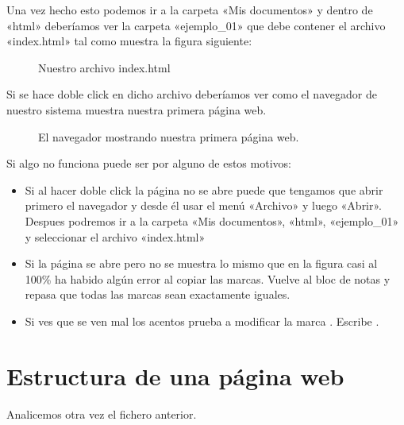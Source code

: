 \documentclass[a4paper,12pt,spanish]{sphinxmanual}
\begin{document}
Una vez hecho esto podemos ir a la carpeta «Mis documentos» y dentro de «html» deberíamos ver la carpeta «ejemplo\_01» que debe contener el archivo «index.html» tal como muestra la figura siguiente:

\begin{figure}[htbp]
\centering
\capstart

\noindent{}
\caption{Nuestro archivo index.html}\label{\detokenize{index:id7}}\end{figure}

Si se hace doble click en dicho archivo deberíamos ver como el navegador de nuestro sistema muestra nuestra primera página web.

\begin{figure}[htbp]
\centering
\capstart

\noindent{}
\caption{El navegador mostrando nuestra primera página web.}\label{\detokenize{index:id8}}\end{figure}

Si algo no funciona puede ser por alguno de estos motivos:
\begin{itemize}
\item {} 
Si al hacer doble click la página no se abre puede que tengamos que abrir primero el navegador y desde él usar el menú «Archivo» y luego «Abrir». Despues podremos ir a la carpeta «Mis documentos», «html», «ejemplo\_01» y seleccionar el archivo «index.html»

\item {} 
Si la página se abre pero no se muestra lo mismo que en la figura casi al 100\% ha habido algún error al copiar las marcas. Vuelve al bloc de notas y repasa que todas las marcas sean exactamente iguales.

\item {} 
Si ves que se ven mal los acentos prueba a modificar la marca . Escribe .

\end{itemize}


\chapter{Estructura de una página web}
\label{\detokenize{index:estructura-de-una-pagina-web}}
Analicemos otra vez el fichero anterior.
\end{document}

